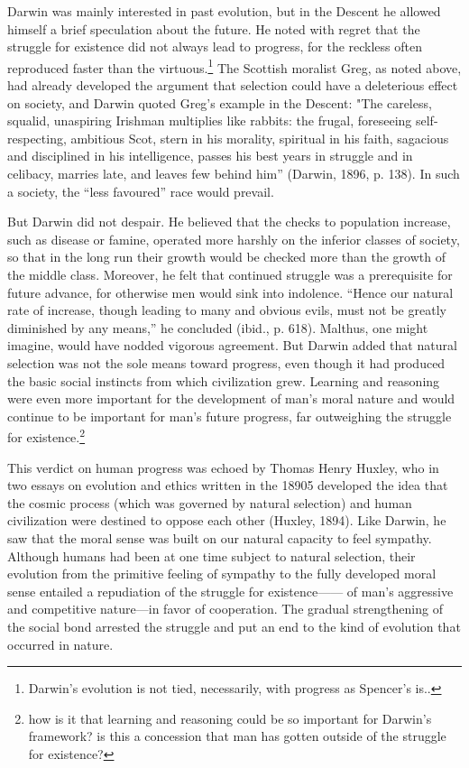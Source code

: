\documentclass[12pt]{letter}
\begin{document}
Darwin was mainly interested in past evolution, but in the Descent he allowed himself a brief speculation about the future. He noted with regret that the struggle for existence did not always lead to progress, for the reckless often reproduced faster than the virtuous.\footnote{Darwin's evolution is not tied, necessarily, with progress as Spencer's is..} The Scottish moralist Greg, as noted above, had already developed the argument that selection could have a deleterious effect on society, and Darwin quoted Greg's example in the Descent: "The careless, squalid, unaspiring Irishman multiplies like rabbits: the frugal, foreseeing self-respecting, ambitious Scot, stern in his morality, spiritual in his faith, sagacious and disciplined in his intelligence, passes his best years in struggle and in celibacy, marries late, and leaves few behind him” (Darwin, 1896, p. 138). In such a society, the “less favoured” race would prevail.

But Darwin did not despair. He believed that the checks to population increase, such as disease or famine, operated more harshly on the inferior classes of society, so that in the long run their growth would be checked more than the growth of the middle class. Moreover, he felt that continued struggle was a prerequisite for future advance, for otherwise men would sink into indolence. “Hence our natural rate of increase, though leading to many and obvious evils, must not be greatly diminished by any means,” he concluded (ibid., p. 618). Malthus, one might imagine, would have nodded vigorous agreement. But Darwin added that natural selection was not the sole means toward progress, even though it had produced the basic social instincts from which civilization grew. Learning and reasoning were even more important for the development of man's moral nature and would continue to be important for man’s future progress, far outweighing the struggle for existence.\footnote{how is it that learning and reasoning could be so important for Darwin's framework? is this a concession that man has gotten outside of the struggle for existence?}

This verdict on human progress was echoed by Thomas Henry Huxley, who in two essays on evolution and ethics written in the 18905 developed the idea that the cosmic process (which was governed by natural selection) and human civilization were destined to oppose each other (Huxley, 1894). Like Darwin, he saw that the moral sense was built on our natural capacity to feel sympathy. Although humans had been at one time subject to natural selection, their evolution from the primitive feeling of sympathy to the fully developed moral sense entailed a repudiation of the struggle for existence—— of man’s aggressive and competitive nature—in favor of cooperation. The gradual strengthening of the social bond arrested the struggle and put an end to the kind of evolution that occurred in nature.
\end{document}
